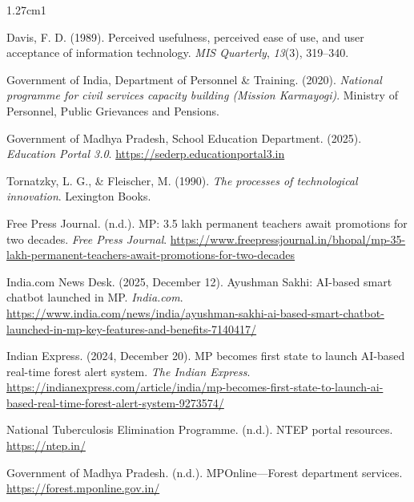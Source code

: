 \documentclass[11pt,a4paper]{article}
\begin{document}
\vspace{0.2cm}
\begingroup
\small\setlength{\parindent}{0pt}\singlespacing\sloppy
\setlength{\emergencystretch}{4em}
\begin{hangparas}{1.27cm}{1}

Davis, F. D. (1989). Perceived usefulness, perceived ease of use, and user
acceptance of information technology. \textit{MIS Quarterly}, \textit{13}(3), 319--340.

\vspace{4pt}
Government of India, Department of Personnel \& Training. (2020).
\textit{National programme for civil services capacity building (Mission Karmayogi)}.
Ministry of Personnel, Public Grievances and Pensions.

\vspace{4pt}
Government of Madhya Pradesh, School Education Department. (2025).
\textit{Education Portal 3.0}. \url{https://sederp.educationportal3.in}

\vspace{4pt}
Tornatzky, L. G., \& Fleischer, M. (1990).
\textit{The processes of technological innovation}. Lexington Books.

\vspace{4pt}
Free Press Journal. (n.d.). MP: 3.5 lakh permanent teachers await promotions for two decades.
\textit{Free Press Journal}. \url{https://www.freepressjournal.in/bhopal/mp-35-lakh-permanent-teachers-await-promotions-for-two-decades}

\vspace{4pt}
India.com News Desk. (2025, December 12). Ayushman Sakhi: AI-based smart chatbot launched in MP.
\textit{India.com}. \url{https://www.india.com/news/india/ayushman-sakhi-ai-based-smart-chatbot-launched-in-mp-key-features-and-benefits-7140417/}

\vspace{4pt}
Indian Express. (2024, December 20). MP becomes first state to launch AI-based real-time forest alert system.
\textit{The Indian Express}. \url{https://indianexpress.com/article/india/mp-becomes-first-state-to-launch-ai-based-real-time-forest-alert-system-9273574/}

\vspace{4pt}
National Tuberculosis Elimination Programme. (n.d.). NTEP portal resources.
\url{https://ntep.in/}

\vspace{4pt}
Government of Madhya Pradesh. (n.d.). MPOnline---Forest department services.
\url{https://forest.mponline.gov.in/}

\end{hangparas}
\endgroup
\end{document}
